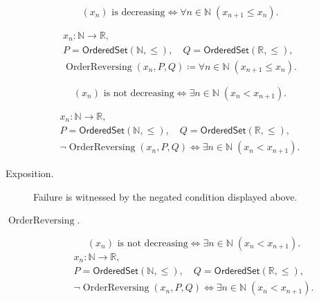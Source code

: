 \begin{remark*}
\[
(x_n)\text{ is decreasing}
\Longleftrightarrow
\forall n\in\mathbb{N}\;(x_{n+1}\le x_n).
\]
\end{remark*}

\begin{remark*}
\[
\begin{gathered}
x_n\colon\mathbb{N}\to\mathbb{R},\\
P=\mathsf{OrderedSet}(\mathbb{N},\leq),\quad
Q=\mathsf{OrderedSet}(\mathbb{R},\leq),\\
\operatorname{OrderReversing}(x_n,P,Q)
\coloneqq
\forall n\in\mathbb{N}\;(x_{n+1}\le x_n).
\end{gathered}
\]
\end{remark*}

\begin{remark*}
\[
(x_n)\text{ is not decreasing}
\Longleftrightarrow
\exists n\in\mathbb{N}\;(x_n<x_{n+1}).
\]
\end{remark*}

\begin{remark*}
\[
\begin{gathered}
x_n\colon\mathbb{N}\to\mathbb{R},\\
P=\mathsf{OrderedSet}(\mathbb{N},\leq),\quad
Q=\mathsf{OrderedSet}(\mathbb{R},\leq),\\
\neg\operatorname{OrderReversing}(x_n,P,Q)
\Longleftrightarrow
\exists n\in\mathbb{N}\;(x_n<x_{n+1}).
\end{gathered}
\]
\end{remark*}
\begin{remark*}
\begin{description}
  \item[Exposition.]
Failure is witnessed by the negated condition displayed above.
  \item[\(\operatorname{OrderReversing}.\)]
\[
(x_n)\text{ is not decreasing}
\Longleftrightarrow
\exists n\in\mathbb{N}\;(x_n<x_{n+1}).
\]
\[
\begin{gathered}
x_n\colon\mathbb{N}\to\mathbb{R},\\
P=\mathsf{OrderedSet}(\mathbb{N},\leq),\quad
Q=\mathsf{OrderedSet}(\mathbb{R},\leq),\\
\neg\operatorname{OrderReversing}(x_n,P,Q)
\Longleftrightarrow
\exists n\in\mathbb{N}\;(x_n<x_{n+1}).
\end{gathered}
\]
\end{description}
\end{remark*}

